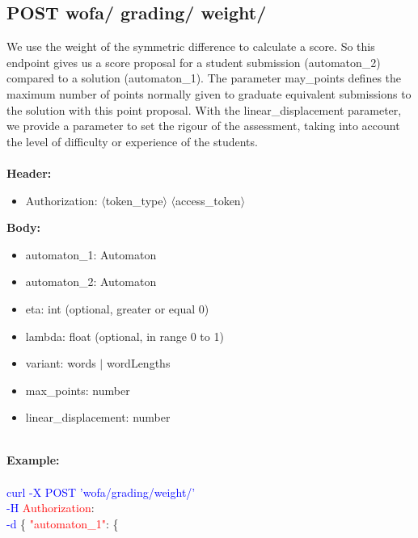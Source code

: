 \subsection{POST wofa/ grading/ weight/}
We use the weight of the symmetric difference to calculate a score. So this endpoint gives us a score proposal for a student submission (automaton\_2) compared to a solution (automaton\_1). The parameter may\_points defines the maximum number of points normally given to graduate equivalent submissions to the solution with this point proposal. With the linear\_displacement parameter, we provide a parameter to set the rigour of the assessment, taking into account the level of difficulty or experience of the students.\\
\ \\
\textbf{Header:}
\begin{itemize}
    \item Authorization: $\langle$token\_type$\rangle$ $\langle$access\_token$\rangle$
\end{itemize}
\textbf{Body:}
\begin{itemize}
    \item automaton\_1: Automaton
    \item automaton\_2: Automaton
    \item eta: int (optional, greater or equal 0)
    \item lambda: float (optional, in range 0 to 1)
    \item variant: words $|$ wordLengths
    \item max\_points: number
    \item linear\_displacement: number
\end{itemize}
\ \\
\textbf{Example:} \\
\ \\
\textcolor{blue}{curl -X POST '\BaseURL wofa/grading/weight/'\\
-H} \textcolor{red}{Authorization}: \Auth \\
\textcolor{blue}{-d} \{ 
\textcolor{red}{"automaton\_1"}: \{ 
